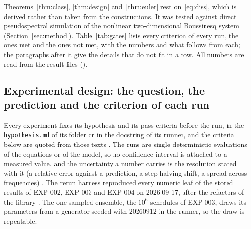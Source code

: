 \documentclass[11pt]{article}
\theoremstyle{remark}
\newcommand{\ev}[1]{\hspace{0.2em}{\small\textsf{[#1]}}}
\newcommand{\fp}[1]{\nolinkurl{#1}}
\begin{document}
Theorems~\ref{thm:class}, \ref{thm:design} and~\ref{thm:euler} rest on~\eqref{eq:diss}, which is derived rather than
taken from the constructions. It was tested against direct pseudospectral simulation of the nonlinear
two-dimensional Boussinesq system (Section~\ref{sec:method}). Table~\ref{tab:gates} lists every
criterion of every run, the ones met and the ones not met, with the numbers and what follows from each;
the paragraphs after it give the details that do not fit in a row. All numbers are read from the
result files (\ev{MV}).

\subsection{Experimental design: the question, the prediction and the criterion of each run}\label{sec:expdesign}

Every experiment fixes its hypothesis and its pass criteria before the run, in the \fp{hypothesis.md} of its
folder or in the docstring of its runner, and the criteria below are quoted from those texts \ev{V}. The runs
are single deterministic evaluations of the equations or of the model, so no confidence interval is attached
to a measured value, and the uncertainty a number carries is the resolution stated with it (a relative error
against a prediction, a step-halving shift, a spread across frequencies) \ev{D}. The rerun harness reproduced
every numeric leaf of the stored results of EXP-002, EXP-003 and EXP-004 on 2026-09-17, after the refactors of
the library \ev{V}. The one sampled ensemble, the $10^{6}$ schedules of EXP-003, draws its parameters from a
generator seeded with $20260912$ in the runner, so the draw is repeatable.
\end{document}
